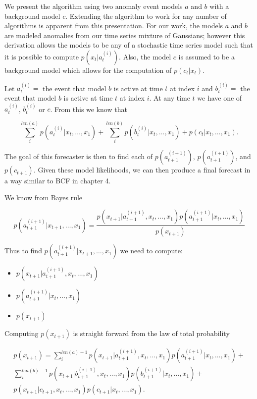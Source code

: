 We present the algorithm using two anomaly event models $a$ and $b$ with a background model $c$.  Extending the algorithm to work for any number of algorithms is apparent from this presentation.  For our work, the models $a$ and $b$ are modeled anomalies from our time series mixture of Gaussians; however this derivation allows the models to be any of a stochastic time series model such that it is possible to compute $p(x_{t} | a^{(i)}_{t})$.  Also, the model $c$ is assumed to be a background model which allows for the computation of $p(c_{t}|x_{t})$.  

Let $a_{t}^{(i)} = $ the event that model $b$ is active at time $t$ at index $i$ and $b_{t}^{(i)} = $ the event that model $b$ is active at time $t$ at index $i$.  At any time $t$ we have one of ${a^{(i)}_{t}}$, ${b^{(i)}_{t}}$ or $c$.  From this we know that 

\begin{equation}
\sum_{i}^{len(a)} p(a_{t}^{(i)}|x_{t}, \ldots, x_{1}) + \sum_{i}^{len(b)} p(b_{t}^{(i)}|x_{t}, \ldots, x_{1}) + p(c_{t}|x_{t}, \ldots, x_{1}).
\end{equation}

The goal of this forecaster is then to find each of $p(a_{t + 1}^{(i + 1)})$, $p(a_{t + 1}^{(i + 1)})$, and $p(c_{t + 1}).$  Given these model likelihoods, we can then produce a final forecast in a way similar to BCF in chapter 4.

We know from Bayes rule 

\begin {equation}
p(a_{t + 1}^{(i + 1)}|x_{t + 1}, \ldots, x_{1}) =
		\frac{p(x_{t + 1}|a^{(i + 1)}_{t + 1}, x_{t}, \ldots, x_{1}) p(a_{t + 1}^{(i + 1)}|x_{t}, \ldots, x_{1})}
	       {p(x_{t + 1})}
\end{equation}

Thus to find $p(a_{t + 1}^{(i + 1)}|x_{t + 1}, \ldots, x_{1})$ we need to compute:
\begin{itemize}
	\item $p(x_{t + 1}|a^{(i + 1)}_{t + 1}, x_{t}, \ldots, x_{1})$
	\item $p(a_{t + 1}^{(i + 1)}|x_{t}, \ldots, x_{1})$
	\item $p(x_{t + 1})$
\end{itemize} 

Computing $p(x_{t + 1})$ is straight forward from the law of total probability

\begin{equation}
	\begin{split}
		p(x_{t + 1}) = \sum_{i}^{len(a) - 1}p(x_{t + 1}|a_{t + 1}^{(i + 1)}, x_{t}, \ldots, x_{1})
						   p(a_{t + 1}^{(i + 1)}|x_{t}, \ldots, x_{1}) + \\
				      \sum_{i}^{len(b) - 1}p(x_{t + 1}|b_{t + 1}^{(i + 1)}, x_{t}, \ldots, x_{1}) 
						   p(b_{t + 1}^{(i + 1)}|x_{t}, \ldots, x_{1}) + \\
	        			      p(x_{t + 1}|c_{t + 1}, x_{t}, \ldots, x_{1})p(c_{t + 1}|x_{t}, \ldots, x_{1}).
	\end{split}
\end{equation}

